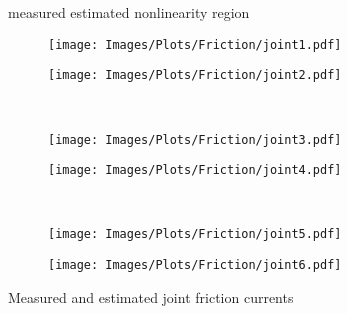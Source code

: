 \begin{figure}
    \centering
    \newcommand*{\figsize}{0.49\columnwidth}

    \begin{center}
    \footnotesize{{\legblue} measured \hspace{0.5em}{\legred} estimated \hspace{0.5em} {\boxgray} nonlinearity region}
    \end{center}

    \begin{subfigure}[b]{\figsize}
        \centering
        \texttt{[image: Images/Plots/Friction/joint1.pdf]}
    \end{subfigure}
    \hfill
    \begin{subfigure}[b]{\figsize}
        \centering
        \texttt{[image: Images/Plots/Friction/joint2.pdf]}
    \end{subfigure}
    \\ \vspace{0.25em}
    \begin{subfigure}[b]{\figsize}
        \centering
        \texttt{[image: Images/Plots/Friction/joint3.pdf]}
    \end{subfigure}
    \hfill
    \begin{subfigure}[b]{\figsize}
        \centering
        \texttt{[image: Images/Plots/Friction/joint4.pdf]}
    \end{subfigure}
    \\ \vspace{0.25em}
    \begin{subfigure}[b]{\figsize}
        \centering
        \texttt{[image: Images/Plots/Friction/joint5.pdf]}
    \end{subfigure}
    \hfill
    \begin{subfigure}[b]{\figsize}
        \centering
        \texttt{[image: Images/Plots/Friction/joint6.pdf]}
    \end{subfigure}

    \caption{Measured and estimated joint friction currents}
    \label{fig:friction}
\end{figure}
